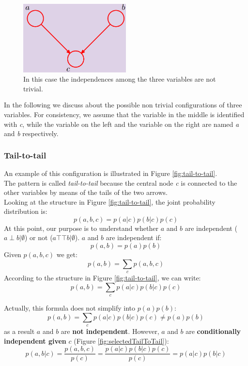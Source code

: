 \begin{figure}[H]
	\centering
	\includegraphics[width=0.5\textwidth]{
		images/08_BayesianNetworks_exampleNonTrivialBayesianNetwork.png
	}
	\caption{In this case the independences among the three variables are not
	trivial.}
	\label{fig:nonTrivialThreeVars}
\end{figure}

In the following we discuss about the possible non trivial configurations of
three variables. For consistency, we assume that the variable in the middle is
identified with \textit{c}, while the variable on the left and the variable on
the right are named \textit{a} and \textit{b} respectively.

\subsubsection{Tail-to-tail}
An example of this configuration is illustrated in Figure \ref{fig:tail-to-tail}.\\
The pattern is called \textit{tail-to-tail} because the central node \textit{c}
is connected to the other variables by means of the tails of the two arrows.\\
Looking at the structure in Figure \ref{fig:tail-to-tail}, the joint probability
distribution is:
\[
	p(a,b,c) = p(a|c)p(b|c)p(c)
\]
At this point, our purpose is to understand whether $a$ and $b$ are independent ($a
\perp b | \emptyset$) or not ($a \top\!\!\!\!\top b | \emptyset$). $a$ and $b$
are independent if:
\[
	p(a,b) = p(a)p(b)
\]
Given $p(a,b,c)$ we get:
\[
	p(a,b) = \sum_{c}p(a,b,c)
\]
According to the structure in Figure \ref{fig:tail-to-tail}, we can write:
\[
	p(a,b) = \sum_{c}p(a|c)p(b|c)p(c)
\]

Actually, this formula does not simplify into $p(a)p(b)$:
\[
	p(a,b) = \sum_{c}p(a|c)p(b|c)p(c) \neq p(a)p(b)
\]
as a result $a$ and $b$ are \textbf{not independent}.
\newline
However, $a$ and $b$ are \textbf{conditionally independent given} $c$ (Figure
\ref{fig:selectedTailToTail}):
\begin{equation*}
	p(a,b|c) = \frac{p(a,b,c)}{p(c)}= \frac{p(a|c)p(b|c)p(c)}{p(c)}= p(a|c)p(b|c)
\end{equation*}

